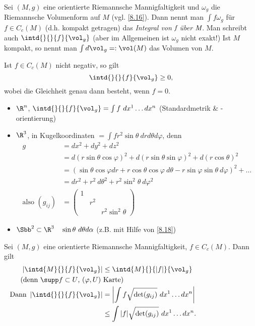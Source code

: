 \begin{defn}\autolabel\lecture
	Sei \( (M,g) \) eine orientierte Riemannsche Mannigfaltigkeit und \( \omega_g \) die Riemannsche Volumenform auf $M$ (vgl. \ref{8.16}). Dann nennt man \( \int f \omega_g \) für \( f \in C_c(M) \) (d.h. kompakt getragen) das \emph{Integral von $\emph{f}$ über \( \emph{M} \)}.
	Man schreibt auch \( \intd{}{}{f}{\vol_g} \) (aber im Allgemeinen ist $\omega_g$ nicht exakt!) Ist $M$ kompakt, so nennt man \( \int d\vol_g =: \vol(M) \) das Volumen von $M$.
\end{defn}

\begin{lem*}
	Ist $f \in C_c(M)$ nicht negativ, so gilt
	\[ \intd{}{}{f}{\vol_g} \geq 0, \]
	wobei die Gleichheit genau dann besteht, wenn \( f=0 \).
\end{lem*}

\begin{exmp*}
	\begin{itemize}
		\item $\R^n$, \( \intd{}{}{f}{\vol_g} = \int f \ dx^1 \dots dx^n \) (Standardmetrik \& -orientierung)
		\item $\R^3$, in Kugelkoordinaten \( = \int fr^2\sin\theta \ dr d\theta d\varphi \), denn
			\begin{align*}
				g &= dx^2 + dy^2 + dz^2\\
				&= d(r\sin\theta\cos\varphi)^2 + d(r\sin\theta\sin\varphi)^2 + d(r\cos\theta)^2\\
				&= (\sin\theta\cos\varphi dr + r\cos\theta\cos\varphi\ d\theta - r\sin\varphi\sin\theta\ d\varphi)^2 + \dots\\
				&= dr^2 + r^2\ d\theta^2 + r^2\sin^2\theta\ d\varphi^2\\
				\text{also } (g_{ij}) &= \begin{pmatrix}
					1 & &\\
					& r^2 &\\
					& & r^2\sin^2\theta
				\end{pmatrix}
			\end{align*}
		\item \( \Sbb^2 \subset \R^3 \quad \sin\theta\ d\theta d\alpha \) (z.B. mit Hilfe von \ref{8.18})
	\end{itemize}
\end{exmp*}

\begin{lem}\autolabel
	Sei \( (M,g) \) eine orientierte Riemannsche Mannigfaltigkeit, $f \in C_c(M)$. Dann gilt
	\begin{align*}
		\left| \intd{M}{}{f}{\vol_g} \right| &\leq \intd{M}{}{|f|}{\vol_g}\\
		\noalign{(denn $\supp f \subset U$, $(\varphi,U)$ Karte)}
		\text{Dann } \left| \intd{}{}{f}{\vol_g} \right| &= \left| \int f \sqrt{\det(g_{ij})}\ dx^1 \dots dx^n \right|\\
		&\leq \int |f| \sqrt{\det(g_{ij})}\ dx^1 \dots dx^n.
	\end{align*}
\end{lem}

